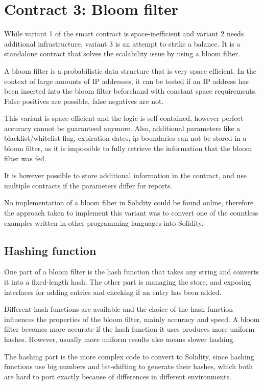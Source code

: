 \section{Contract 3: Bloom filter}

While variant 1 of the smart contract is space-inefficient and variant 2 needs additional infrastructure, variant 3 is an attempt to strike a balance. It is a standalone contract that solves the scalability issue by using a bloom filter.

A bloom filter is a probabilistic data structure that is very space efficient. In the context of large amounts of IP addresses, it can be tested if an IP address has been inserted into the bloom filter beforehand with constant space requirements. False positives are possible, false negatives are not.

This variant is space-efficient and the logic is self-contained, however perfect accuracy cannot be guaranteed anymore. Also, additional parameters like a blacklist/whitelist flag, expiration dates, ip boundaries can not be stored in a bloom filter, as it is impossible to fully retrieve the information that the bloom filter was fed.

It is however possible to store additional information in the contract, and use multiple contracts if the parameters differ for reports.

No implementation of a bloom filter in Solidity could be found online, therefore the approach taken to implement this variant was to convert one of the countless examples written in other programming languages into Solidity.

\subsection{Hashing function}

One part of a bloom filter is the hash function that takes any string and converts it into a fixed-length hash. The other part is managing the store, and exposing interfaces for adding entries and checking if an entry has been added.

Different hash functions are available and the choice of the hash function influences the properties of the bloom filter, mainly accuracy and speed. A bloom filter becomes more accurate if the hash function it uses produces more uniform hashes. However, usually more uniform results also means slower hashing.

The hashing part is the more complex code to convert to Solidity, since hashing functions use big numbers and bit-shifting to generate their hashes, which both are hard to port exactly because of differences in different environments.

